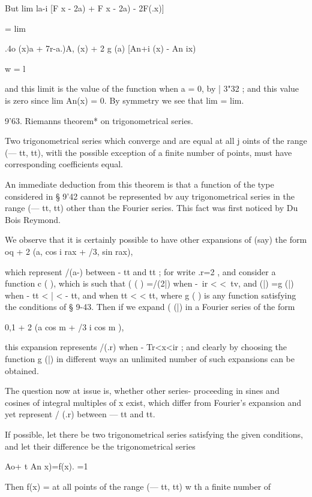 {But lim la-i [F x - 2a) + F x - 2a) - 2F(.x)] 



= lim 



.4o (x)a +   7r-a.)A, (x) + 2 g  (a) [An+i (x) - An ix)  



w = l 



and this limit is the value of the function when a = 0, by | 3"32 ; and this 
value is zero since lim An(x) = 0. By symmetry we see that lim = lim. 

9'63. Riemanns theorem* on trigonometrical series. 

Two trigonometrical series which converge and are equal at all j oints of 
the range (— tt, tt), witli the possible exception of a finite number of points, 
must have corresponding coefficients equal. 

An immediate deduction from this theorem is that a function of the type considered 
in § 9'42 cannot be represented bv auy trigonometrical series in the range (— tt, tt) other 
than the Fourier series. This fact was first noticed by Du Bois Reymond. 

We observe that it is certainly possible to have other expansions of (say) the form 
oq + 2 (a,  cos i rax + /3,  sin   rax), 

which represent /(a-) between - tt and tt ; for write .r=2 , and consider a function c  ( ), 
which is such that (  ( ) =/(2|) when -\ ir < <\ tv, and (|) =g (|) when - tt < | < -  tt, 
and when  tt <   < tt, where g ( ) is any function satisfying the conditions of § 9-43. 
Then if we expand (  (|) in a Fourier series of the form 

0,1 + 2 (a  cos m  + /3 i cos m ), 

this expansion represents /(.r) when - Tr<x<ir ; and clearly by choosing the function g (|) 
in different ways an unlimited number of such expansions can be obtained. 

The question now at issue is, whether other series- proceeding in sines and cosines of 
integral multiples of x exist, which differ from Fourier's expansion and yet represent / (.r) 
between — tt and tt. 

If possible, let there be two trigonometrical series satisfying the given 
conditions, and let their difference be the trigonometrical series 

Ao+ t An x)=f(x). 
 =1 

Then f(x) = at all points of the range (— tt, tt) w th a finite number of 

}
